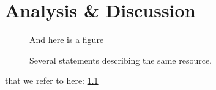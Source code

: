 \documentclass[a4paper,11pt]{kth-mag}
\begin{document}
\chapter{Analysis \& Discussion}
    \label{sec:analysis_discussion}
    





\begin{figure}[ht]
\begin{center}
And here is a figure
\caption{\small{Several statements describing the same resource.}}\label{RDF_4}
\end{center}
\end{figure}

that we refer to here: \ref{RDF_4}
\end{document}
